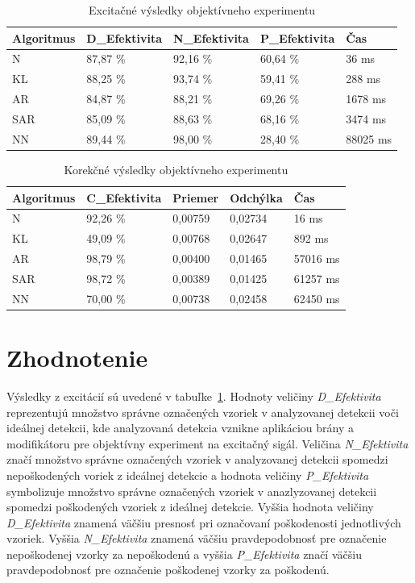 \begin{table}[!h]
\centering
\caption{Excitačné výsledky objektívneho experimentu}
\begin{tabular}{l l l l l}
\hline
Algoritmus & D\_Efektivita & N\_Efektivita & P\_Efektivita & Čas\\
\hline
N & 87,87 \% & 92,16 \% & 60,64 \% & 36 ms\\
KL & 88,25 \% & 93,74 \% & 59,41 \% & 288 ms\\
AR & 84,87 \% & 88,21 \% & 69,26 \% & 1678 ms\\
SAR & 85,09 \% & 88,63 \% & 68,16 \% & 3474 ms\\
NN & 89,44 \% & 98,00 \% & 28,40 \% & 88025 ms\\
\hline
\end{tabular}
\label{tabulka:objektivny-excitacia}
\end{table}

\begin{table}[!h]
\centering
\caption{Korekčné výsledky objektívneho experimentu}
\begin{tabular}{l l l l l}
\hline
Algoritmus & C\_Efektivita & Priemer & Odchýlka  & Čas\\
\hline
N & 92,26 \% & 0,00759 & 0,02734 & 16 ms\\
KL & 49,09 \% & 0,00768 & 0,02647 & 892 ms\\
AR & 98,79 \% & 0,00400 & 0,01465 & 57016 ms\\
SAR & 98,72 \% & 0,00389 & 0,01425 & 61257 ms\\
NN & 70,00 \% & 0,00738 & 0,02458 & 62450 ms\\
\hline
\end{tabular}
\label{tabulka:objektivny-korekcia}
\end{table}

\section{Zhodnotenie}
Výsledky z excitácií sú uvedené v tabuľke~\ref{tabulka:objektivny-excitacia}. Hodnoty veličiny \textit{D\_Efektivita} reprezentujú množstvo správne označených vzoriek v analyzovanej detekcii voči ideálnej detekcii, kde analyzovaná detekcia vznikne aplikáciou brány a modifikátoru pre objektívny experiment na excitačný sigál. Veličina \textit{N\_Efektivita} značí množstvo správne označených vzoriek v analyzovanej detekcii spomedzi nepoškodených voriek z ideálnej detekcie a hodnota veličiny \textit{P\_Efektivita} symbolizuje množstvo správne označených vzoriek v anazlyzovanej detekcii spomedzi poškodených vzoriek z ideálnej detekcie. Vyššia hodnota veličiny \textit{D\_Efektivita} znamená väčšiu presnosť pri označovaní poškodenosti jednotlivých vzoriek. Vyššia \textit{N\_Efektivita} znamená väčšiu pravdepodobnosť pre označenie nepoškodenej vzorky za nepoškodenú a vyššia \textit{P\_Efektivita} značí väčšiu pravdepodobnosť pre označenie poškodenej vzorky za poškodenú. 

